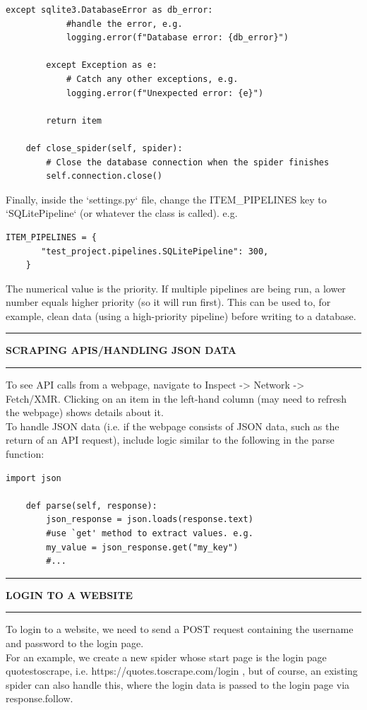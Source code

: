 \documentclass[8pt]{extarticle}
\newcommand{\heading}[1]{%
    \noindent
    \rule{\linewidth}{0.4pt}
    \begin{center}
        \vspace{-1ex}
        \textbf{#1}        
        \vspace{-2.5ex}
    \end{center}
    \rule{\linewidth}{0.4pt}
}
\begin{document}
\begin{multicols}{3}
\begin{lstlisting}[style=python]
        except sqlite3.DatabaseError as db_error:
            #handle the error, e.g.
            logging.error(f"Database error: {db_error}")

        except Exception as e:
            # Catch any other exceptions, e.g.
            logging.error(f"Unexpected error: {e}")

        return item

    def close_spider(self, spider):
        # Close the database connection when the spider finishes
        self.connection.close()
\end{lstlisting}

Finally, inside the `settings.py` file, change the ITEM\_PIPELINES key to `SQLitePipeline` (or whatever the class is called). e.g.
\begin{lstlisting}[style=python]
    ITEM_PIPELINES = {
       "test_project.pipelines.SQLitePipeline": 300,
    }    
\end{lstlisting}
The numerical value is the priority. If multiple pipelines are being run, a lower number equals higher priority (so it will run first). This can be used to, for example, clean data (using a high-priority pipeline) before writing to a database.

\heading{SCRAPING APIS/HANDLING JSON DATA}

To see API calls from a webpage, navigate to Inspect -> Network -> Fetch/XMR. Clicking on an item in the left-hand column (may need to refresh the webpage) shows details about it.\\

To handle JSON data (i.e. if the webpage consists of JSON data, such as the return of an API request), include logic similar to the following in the parse function:

\begin{lstlisting}[style=python]
    import json 
    
    def parse(self, response):
        json_response = json.loads(response.text)
        #use `get' method to extract values. e.g.
        my_value = json_response.get("my_key")
        #...
\end{lstlisting}

\heading{LOGIN TO A WEBSITE}

To login to a website, we need to send a POST request containing the username and password to the login page.\\

For an example, we create a new spider whose start page is the login page quotestoscrape, i.e. https://quotes.toscrape.com/login , but
of course, an existing spider can also handle this, where the login data is passed to the login page via response.follow.\\


\end{multicols}
\end{document}
